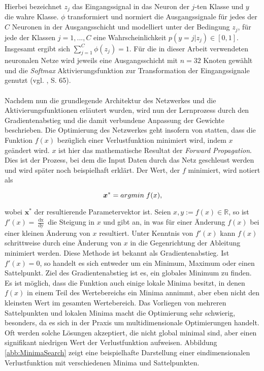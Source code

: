 \documentclass[a4paper,11pt]{article}
\begin{document}
Hierbei bezeichnet $z_j$ das Eingangssignal in das Neuron der $j$-ten Klasse und $y$ die wahre Klasse. $\phi$ transformiert und normiert die Ausgangssignale für jedes der $C$ Neuronen in der Ausgangsschicht und modelliert unter der Bedingung $z_j$, für jede der Klassen $j = 1,..., C$ eine Wahrscheinlichkeit $p(y=j|z_j) \in \left[0, 1\right]$. Insgesamt ergibt sich $\sum_{j = 1}^C \phi(z_j) = 1$. Für die in dieser Arbeit verwendeten neuronalen Netze wird jeweils eine Ausgangsschicht mit $n = 32$ Knoten gewählt und die \textit{Softmax} Aktivierungsfunktion zur Transformation der Eingangssignale genutzt (vgl. \cite{deepEssentials}, S. 65).\\
\\
Nachdem nun die grundlegende Architektur des Netzwerkes und die Aktivierungsfunktionen erläutert wurden, wird nun der Lernprozess durch den Gradientenabstieg und die damit verbundene Anpassung der Gewichte beschrieben. Die Optimierung des Netzwerkes geht insofern von statten, dass die Funktion $f(x)$ bezüglich einer Verlustfunktion minimiert wird, indem $x$ geändert wird. $x$ ist hier das mathematische Resultat der \textit{Forward Propagation}. Dies ist der Prozess, bei dem die Input Daten durch das Netz geschleust werden und wird später noch beispielhaft erklärt.
Der Wert, der $f$ minimiert, wird notiert als 

\[\bm{x}^\ast = argmin \hspace{0.1cm} f(x),\]

wobei $\bm{x}^\ast$ der resultierende Parametervektor ist.
Seien $x, y := f(x) \in \mathbb{R}$, so ist $f'(x) = \frac{\mathop{dx}}{\mathop{dy}}$ die Steigung in $x$ und gibt an, in was für einer Änderung $f(x)$ bei einer kleinen Änderung von $x$ resultiert. Unter Kenntnis von $f'(x)$ kann $f(x)$ schrittweise durch eine Änderung von $x$ in die Gegenrichtung der Ableitung minimiert werden. Diese Methode ist bekannt als Gradientenabstieg. Ist $f'(x) = 0$, so handelt es sich entweder um ein Minimum, Maximum oder einen Sattelpunkt. Ziel des Gradientenabstieg ist es, ein globales Minimum zu finden. Es ist möglich, dass die Funktion auch einige lokale Minima besitzt, in denen $f(x)$ in einem Teil des Wertebereichs ein Minima annimmt, aber eben nicht den kleinsten Wert im gesamten Wertebereich. Das Vorliegen von mehreren Sattelpunkten und lokalen Minima macht die Optimierung sehr schwierig, besonders, da es sich in der Praxis um multidimensionale Optimierungen handelt. Oft werden solche Lösungen akzeptiert, die nicht global minimal sind, aber einen signifikant niedrigen Wert der Verlustfunktion aufweisen. Abbildung \ref{abb:MinimaSearch} zeigt eine beispielhafte Darstellung einer eindimensionalen Verlustfunktion mit verschiedenen Minima und Sattelpunkten.
\end{document}
